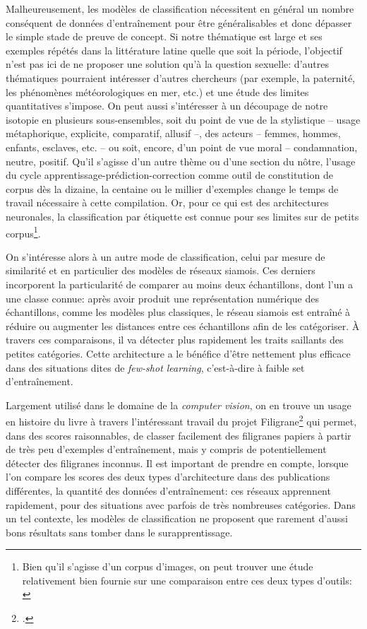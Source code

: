 Malheureusement, les modèles de classification nécessitent en général un nombre conséquent de données d'entraînement pour être généralisables et donc dépasser le simple stade de preuve de concept. Si notre thématique est large et ses exemples répétés dans la littérature latine quelle que soit la période, l'objectif n'est pas ici de ne proposer une solution qu'à la question sexuelle: d'autres thématiques pourraient intéresser d'autres chercheurs (par exemple, la paternité, les phénomènes météorologiques en mer, etc.) et une étude des limites quantitatives s'impose. On peut aussi s'intéresser à un découpage de notre isotopie en plusieurs sous-ensembles, soit du point de vue de la stylistique -- usage métaphorique, explicite, comparatif, allusif --, des acteurs -- femmes, hommes, enfants, esclaves, etc. -- ou soit, encore, d'un point de vue moral -- condamnation, neutre, positif. Qu'il s'agisse d'un autre thème ou d'une section du nôtre, l'usage du cycle apprentissage-prédiction-correction comme outil de constitution de corpus dès la dizaine, la centaine ou le millier d'exemples change le temps de travail nécessaire à cette compilation. Or, pour ce qui est des architectures neuronales, la classification par étiquette est connue pour ses limites sur de petits corpus\footnote{Bien qu'il s'agisse d'un corpus d'images, on peut trouver une étude relativement bien fournie sur une comparaison entre ces deux types d'outils: \textcite{pasupa_comparison_2016}}. %

On s'intéresse alors à un autre mode de classification, celui par mesure de similarité et en particulier des modèles de réseaux siamois. Ces derniers incorporent la particularité de comparer au moins deux échantillons, dont l'un a une classe connue: après avoir produit une représentation numérique des échantillons, comme les modèles plus classiques, le réseau siamois est entraîné à réduire ou augmenter les distances entre ces échantillons afin de les catégoriser. À travers ces comparaisons, il va détecter plus rapidement les traits saillants des petites catégories. Cette architecture a le bénéfice d'être nettement plus efficace dans des situations dites de \textit{few-shot learning}, c'est-à-dire à faible set d'entraînement. 

Largement utilisé dans le domaine de la \textit{computer vision}, on en trouve un usage en histoire du livre à travers l'intéressant travail du projet Filigrane\footcite{shen_large-scale_2021} qui permet, dans des scores raisonnables, de classer facilement des filigranes papiers à partir de très peu d'exemples d'entraînement, mais y compris de potentiellement détecter des filigranes inconnus. Il est important de prendre en compte, lorsque l'on compare les scores des deux types d'architecture dans des publications différentes, la quantité des données d'entraînement: ces réseaux apprennent rapidement, pour des situations avec parfois de très nombreuses catégories. Dans un tel contexte, les modèles de classification ne proposent que rarement d'aussi bons résultats sans tomber dans le surapprentissage.


